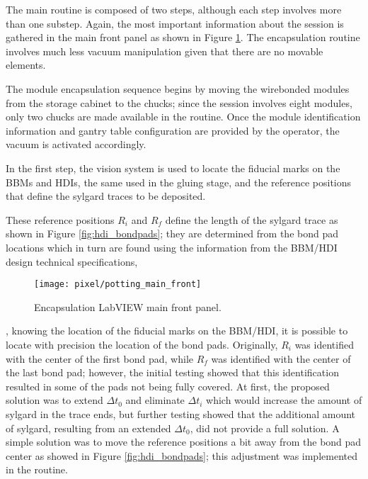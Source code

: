 The main routine is composed of two steps, although each step involves more than one substep. Again, the most important information about the session is gathered in the main front panel as shown in Figure \ref{fig:potting_main_front}. The encapsulation routine involves much less vacuum manipulation given that there are no movable elements.

The module encapsulation sequence begins by moving the wirebonded modules from the storage cabinet to the chucks; since the session involves eight modules, only two chucks are made available in the routine. Once the module identification information and gantry table configuration are provided by the operator, the vacuum is activated accordingly.

In the first step, the vision system is used to locate the fiducial marks on the BBMs and HDIs, the same used in the gluing stage, and the reference positions that define the sylgard traces to be deposited. 

These reference positions $R_i$ and $R_f$ define the length of the sylgard trace as shown in Figure \ref{fig:hdi_bondpads}; they are determined from the bond pad locations which in turn are found using the information from the BBM/HDI design technical specifications, 

\begin{landscape}
\begin{figure}[h]
\begin{center}
    \vspace{-2.9cm}
    \hspace{-1cm}
    \texttt{[image: pixel/potting\_main\_front]}
    \caption[Encapsulation LabVIEW main front panel]{Encapsulation LabVIEW main front panel.}\label{fig:potting_main_front}
    \vspace{-2cm}
    \hspace{-2cm}
\end{center}
\end{figure}
\end{landscape}

\noindent \ie, knowing the location of the fiducial marks on the BBM/HDI, it is possible to locate with precision the location of the bond pads. Originally, $R_i$ was identified with the center of the first bond pad, while $R_f$ was identified with the center of the last bond pad; however, the initial testing showed that this identification resulted in some of the pads not being fully covered. At first, the proposed solution was to extend $\Delta t_0$ and eliminate $\Delta t_i$ which would increase the amount of sylgard in the trace ends, but further testing showed that the additional amount of sylgard, resulting from an extended $\Delta t_0$, did not provide a full solution. A simple solution was to move the reference positions a bit away from the bond pad center as showed in Figure \ref{fig:hdi_bondpads}; this adjustment was implemented in the routine. 

